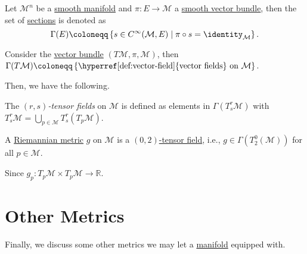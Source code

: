 \begin{notation}
	Let \(\mathcal{M} ^n \) be a \hyperref[def:smooth-manifold]{smooth manifold} and \(\pi \colon E \to \mathcal{M} \) a \hyperref[def:vector-bundle]{smooth vector bundle}, then the set of \hyperref[def:section]{sections} is denoted as
	\[
		\Gamma (E) \coloneqq \left\{ s\in C^{\infty} (\mathcal{M} , E) \mid \pi \circ s = \identity_{\mathcal{M} } \right\}.
	\]
\end{notation}

\begin{eg}
	Consider the \hyperref[def:vector-bundle]{vector bundle} \((T\mathcal{M} , \pi , \mathcal{M} )\), then \(\Gamma (T\mathcal{M} ) \coloneqq \left\{ \text{\hyperref[def:vector-field]{vector fields} on } \mathcal{M} \right\} \).
\end{eg}


Then, we have the following.

\begin{definition}\label{def:tensor-field}
	The \emph{\((r, s)\)-tensor fields} on \(\mathcal{M} \) is defined as elements in \(\Gamma (T_s^r \mathcal{M} )\) with \(T_s^r \mathcal{M} = \bigcup_{p\in \mathcal{M} }T^r_s(T_p \mathcal{M} )\).
\end{definition}

\begin{eg}
	A \hyperref[def:Riemannian-metric]{Riemannian metric} \(g\) on \(\mathcal{M} \) is a \hyperref[def:tensor-field]{\((0, 2)\)-tensor field}, i.e., \(g\in \Gamma (T_2^0 (\mathcal{M} ))\) for all \(p \in \mathcal{M} \).
\end{eg}
\begin{explanation}
	Since \(g_p \colon T_p \mathcal{M} \times T_p \mathcal{M} \to \mathbb{R} \).
\end{explanation}

\section{Other Metrics}
Finally, we discuss some other metrics we may let a \hyperref[def:smooth-manifold]{manifold} equipped with.

